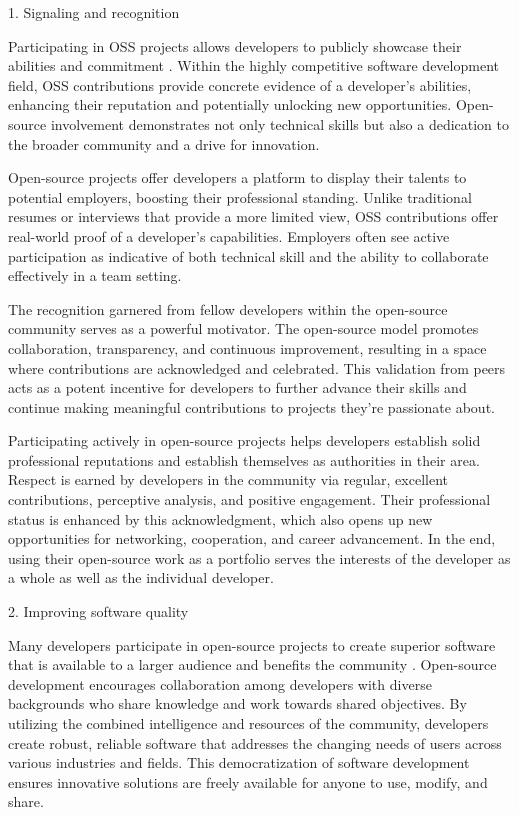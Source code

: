 1. Signaling and recognition

Participating in OSS projects allows developers to publicly showcase their abilities and commitment \cite{05bitzer2007intrinsic,06ye2003toward,07zhao2024openrank,08zhang2024paid,09lakhani2005hackers,10wu2007empirical,11gerosa2021shifting,12choi2015characteristics,13li2012leadership,15roberts2006understanding,17alexander2002working,18oreg2008exploring}. Within the highly competitive software development field, OSS contributions provide concrete evidence of a developer's abilities, enhancing their reputation and potentially unlocking new opportunities.  Open-source involvement demonstrates not only technical skills but also a dedication to the broader community and a drive for innovation.


Open-source projects offer developers a platform to display their talents to potential employers, boosting their professional standing. Unlike traditional resumes or interviews that provide a more limited view, OSS contributions offer real-world proof of a developer's capabilities. Employers often see active participation as indicative of both technical skill and the ability to collaborate effectively in a team setting.

The recognition garnered from fellow developers within the open-source community serves as a powerful motivator. The open-source model promotes collaboration, transparency, and continuous improvement, resulting in a space where contributions are acknowledged and celebrated. This validation from peers acts as a potent incentive for developers to further advance their skills and continue making meaningful contributions to projects they're passionate about.

Participating actively in open-source projects helps developers establish solid professional reputations and establish themselves as authorities in their area. Respect is earned by developers in the community via regular, excellent contributions, perceptive analysis, and positive engagement. Their professional status is enhanced by this acknowledgment, which also opens up new opportunities for networking, cooperation, and career advancement. In the end, using their open-source work as a portfolio serves the interests of the developer as a whole as well as the individual developer.

2. Improving software quality


Many developers participate in open-source projects to create superior software that is available to a larger audience and benefits the community \cite{13li2012leadership,15roberts2006understanding}. Open-source development encourages collaboration among developers with diverse backgrounds who share knowledge and work towards shared objectives. By utilizing the combined intelligence and resources of the community, developers create robust, reliable software that addresses the changing needs of users across various industries and fields. This democratization of software development ensures innovative solutions are freely available for anyone to use, modify, and share.

